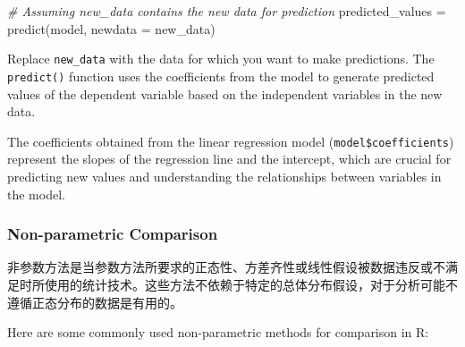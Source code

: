 \documentclass[
]{article}
\newenvironment{Shaded}{}{}
\newcommand{\AttributeTok}[1]{\textcolor[rgb]{0.49,0.56,0.16}{#1}}
\newcommand{\CommentTok}[1]{\textcolor[rgb]{0.38,0.63,0.69}{\textit{#1}}}
\newcommand{\FunctionTok}[1]{\textcolor[rgb]{0.02,0.16,0.49}{#1}}
\newcommand{\NormalTok}[1]{#1}
\newcommand{\OtherTok}[1]{\textcolor[rgb]{0.00,0.44,0.13}{#1}}
\begin{document}
\begin{Shaded}
\begin{Highlighting}[]
\CommentTok{\# Assuming \textquotesingle{}new\_data\textquotesingle{} contains the new data for prediction}
\NormalTok{predicted\_values }\OtherTok{=} \FunctionTok{predict}\NormalTok{(model, }\AttributeTok{newdata =}\NormalTok{ new\_data)}
\end{Highlighting}
\end{Shaded}

Replace \texttt{new\_data} with the data for which you want to make
predictions. The \texttt{predict()} function uses the coefficients from
the model to generate predicted values of the dependent variable based
on the independent variables in the new data.

The coefficients obtained from the linear regression model
(\texttt{model\$coefficients}) represent the slopes of the regression
line and the intercept, which are crucial for predicting new values and
understanding the relationships between variables in the model.

\hypertarget{non-parametric-comparison}{%
\subsubsection{Non-parametric
Comparison}\label{non-parametric-comparison}}

非参数方法是当参数方法所要求的正态性、方差齐性或线性假设被数据违反或不满足时所使用的统计技术。这些方法不依赖于特定的总体分布假设，对于分析可能不遵循正态分布的数据是有用的。

Here are some commonly used non-parametric methods for comparison in R:
\end{document}
